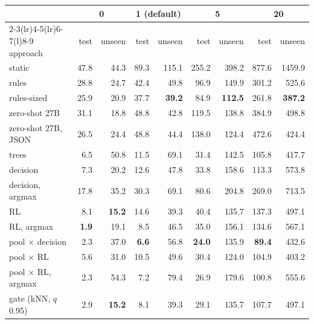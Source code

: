 \begin{tabular}{@{}lrrrrrrrr@{}}
\toprule
& \multicolumn{2}{c}{0} & \multicolumn{2}{c}{1 (default)} & \multicolumn{2}{c}{5} & \multicolumn{2}{c}{20} \\
\cmidrule(lr){2-3}\cmidrule(lr){4-5}\cmidrule(lr){6-7}\cmidrule(l){8-9}
approach & test & unseen & test & unseen & test & unseen & test & unseen \\
\midrule
static & 47.8 & 44.3 & 89.3 & 115.1 & 255.2 & 398.2 & 877.6 & 1459.9 \\
rules & 28.8 & 24.7 & 42.4 & 49.8 & 96.9 & 149.9 & 301.2 & 525.6 \\
rules-sized & 25.9 & 20.9 & 37.7 & \textbf{39.2} & 84.9 & \textbf{112.5} & 261.8 & \textbf{387.2} \\
zero-shot 27B & 31.1 & 18.8 & 48.8 & 42.8 & 119.5 & 138.8 & 384.9 & 498.8 \\
zero-shot 27B, JSON & 26.5 & 24.4 & 48.8 & 44.4 & 138.0 & 124.4 & 472.6 & 424.4 \\
trees & 6.5 & 50.8 & 11.5 & 69.1 & 31.4 & 142.5 & 105.8 & 417.7 \\
decision & 7.3 & 20.2 & 12.6 & 47.8 & 33.8 & 158.6 & 113.3 & 573.8 \\
decision, argmax & 17.8 & 35.2 & 30.3 & 69.1 & 80.6 & 204.8 & 269.0 & 713.5 \\
RL & 8.1 & \textbf{15.2} & 14.6 & 39.3 & 40.4 & 135.7 & 137.3 & 497.1 \\
RL, argmax & \textbf{1.9} & 19.1 & 8.5 & 46.5 & 35.0 & 156.1 & 134.6 & 567.1 \\
pool $\times$ decision & 2.3 & 37.0 & \textbf{6.6} & 56.8 & \textbf{24.0} & 135.9 & \textbf{89.4} & 432.6 \\
pool $\times$ RL & 5.6 & 31.0 & 10.5 & 49.6 & 30.4 & 124.0 & 104.9 & 403.2 \\
pool $\times$ RL, argmax & 2.3 & 54.3 & 7.2 & 79.4 & 26.9 & 179.6 & 100.8 & 555.6 \\
gate (kNN, $q$ 0.95) & 2.9 & \textbf{15.2} & 8.1 & 39.3 & 29.1 & 135.7 & 107.7 & 497.1 \\
\bottomrule
\end{tabular}
